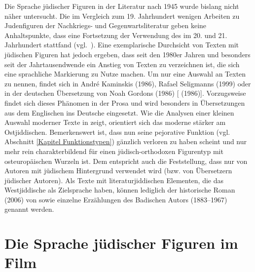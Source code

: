 Die Sprache jüdischer Figuren in der Literatur nach 1945 wurde bislang nicht näher untersucht. Die im Vergleich zum 19. Jahrhundert wenigen Arbeiten zu Judenfiguren der Nachkriegs- und Gegenwartsliteratur geben keine Anhaltspunkte, dass eine Fortsetzung der Verwendung des \hai{{\LiJi}} im 20. und 21. Jahrhundert stattfand (vgl.\, \citealt{Heuser2011,Mueller1984,Schmelzkopf1983}). Eine exemplarische Durchsicht von Texten mit jüdischen Figuren hat jedoch ergeben, dass seit den 1980er Jahren und besonders seit der Jahrtausendwende ein Anstieg von Texten zu verzeichnen ist, die sich eine sprachliche Markierung zu Nutze machen. Um nur eine Auswahl an Texten zu nennen, findet sich \hai{{\LiJi}} in André Kaminskis  (1986), Rafael Seligmanns  (1999) oder in der deutschen Übersetzung von Noah Gordons  (1986) [ (1986)]. 
Vorzugsweise findet sich dieses Phänomen in der Prosa und wird besonders in Übersetzungen aus dem Englischen ins Deutsche eingesetzt. Wie die Analysen einer kleinen Auswahl moderner Texte in \textcite{SchaeferDiss} zeigt, orientiert sich das moderne \hai{{\LiJizwei}} stärker am Ostjiddischen. Bemerkenswert ist, dass \hai{{\LiJizwei}} nun seine pejorative Funktion (vgl.\, Abschnitt \ref{Kapitel Funktionstypen}) gänzlich verloren zu haben scheint und nur mehr rein charakterbildend für einen jüdisch-orthodoxen Figurentyp mit osteuropäischen Wurzeln ist. Dem entspricht auch die Feststellung, dass \hai{{\LiJizwei}} nur von Autoren mit jüdischem Hintergrund verwendet wird (bzw. von Übersetzern jüdischer Autoren). Als Texte mit literaturjiddischen Elementen, die das Westjiddische als Zielsprache haben, können lediglich der historische Roman  (2006) von 
sowie einzelne Erzählungen des Badischen Autors  (1883–1967) genannt werden.    


\section{Die Sprache jüdischer Figuren im Film}\label{fiji}

